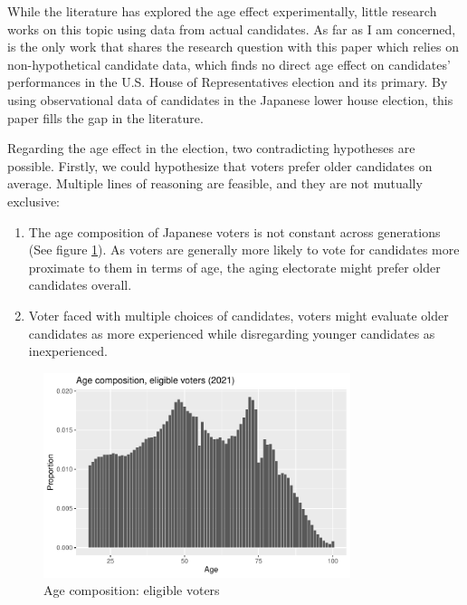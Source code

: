 \documentclass[a4paper, 12pt]{article}\usepackage[dvipdfmx]{graphicx}\usepackage[]{xcolor}
\begin{document}

While the literature has explored the age effect experimentally, little research works on this topic using data from actual candidates. As far as I am concerned, \citet{stockemer2023young} is the only work that shares the research question with this paper which relies on non-hypothetical candidate data, which finds no direct age effect on candidates' performances in the U.S. House of Representatives election and its primary. By using observational data of candidates in the Japanese lower house election, this paper fills the gap in the literature. 

Regarding the age effect in the election, two contradicting hypotheses are possible. Firstly, we could hypothesize that voters prefer older candidates on average. Multiple lines of reasoning are feasible, and they are not mutually exclusive: 

\begin{enumerate}
  \item The age composition of Japanese voters is not constant across generations (See figure \ref{voters}). As voters are generally more likely to vote for candidates more proximate to them in terms of age, the aging electorate might prefer older candidates overall. 
  
  \item Voter faced with multiple choices of candidates, voters might evaluate older candidates as more experienced while disregarding younger candidates as inexperienced. 
\end{enumerate}  

\begin{figure}
\centering
  \includegraphics[width=0.8\textwidth]{figure/comp_age/pop_voters.pdf}
  \caption{Age composition: eligible voters}
  \label{voters}
\end{figure}
\end{document}
